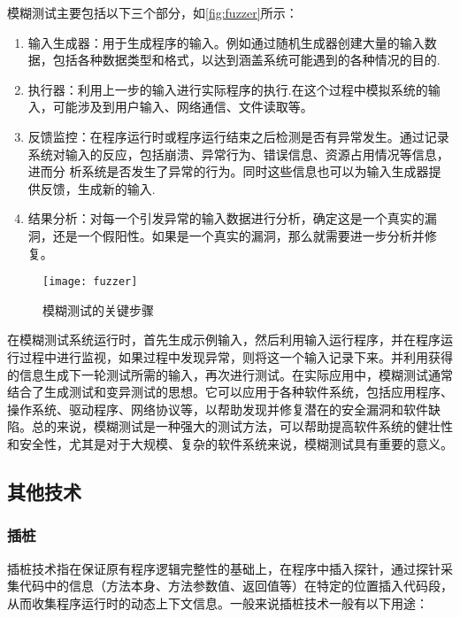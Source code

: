 模糊测试主要包括以下三个部分，如\autoref{fig:fuzzer}\cite{zhu2022fuzzing}所示：

\begin{enumerate}
\item 输入生成器：用于生成程序的输入。例如通过随机生成器创建大量的输入数据，包括各种数据类型和格式，以达到涵盖系统可能遇到的各种情况的目的.
\item 执行器：利用上一步的输入进行实际程序的执行.在这个过程中模拟系统的输入，可能涉及到用户输入、网络通信、文件读取等。
\item 反馈监控：在程序运行时或程序运行结束之后检测是否有异常发生。通过记录系统对输入的反应，包括崩溃、异常行为、错误信息、资源占用情况等信息，进而分 析系统是否发生了异常的行为。同时这些信息也可以为输入生成器提供反馈，生成新的输入.
\item 结果分析：对每一个引发异常的输入数据进行分析，确定这是一个真实的漏洞，还是一个假阳性。如果是一个真实的漏洞，那么就需要进一步分析并修复。
\end{enumerate}

\begin{figure}[ht]
    \centering
    \texttt{[image: fuzzer]}
    \caption{\label{fig:fuzzer}模糊测试的关键步骤}
\end{figure}


在模糊测试系统运行时，首先生成示例输入，然后利用输入运行程序，并在程序运行过程中进行监视，如果过程中发现异常，则将这一个输入记录下来。并利用获得的信息生成下一轮测试所需的输入，再次进行测试。在实际应用中，模糊测试通常结合了生成测试和变异测试的思想。它可以应用于各种软件系统，包括应用程序、操作系统、驱动程序、网络协议等，以帮助发现并修复潜在的安全漏洞和软件缺陷。总的来说，模糊测试是一种强大的测试方法，可以帮助提高软件系统的健壮性和安全性，尤其是对于大规模、复杂的软件系统来说，模糊测试具有重要的意义。

\subsection{其他技术}

\subsubsection{插桩}

插桩技术指在保证原有程序逻辑完整性的基础上，在程序中插入探针，通过探针采集代码中的信息（方法本身、方法参数值、返回值等）在特定的位置插入代码段，从而收集程序运行时的动态上下文信息。一般来说插桩技术一般有以下用途：

